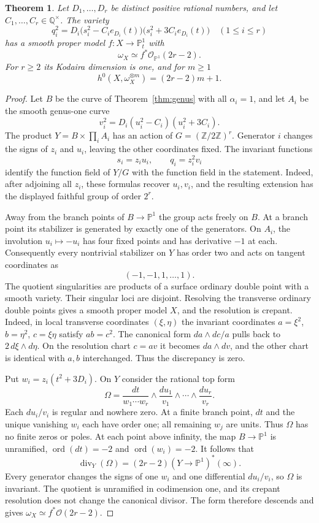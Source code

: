 \documentclass[11pt,a4paper]{article}
\newtheorem{theorem}{Theorem}[section]
\newcommand{\Q}{\mathbb Q}
\newcommand{\Pp}{\mathbb P}
\newcommand{\divisor}{\operatorname{div}}
\begin{document}
\begin{theorem}\label{thm:canonical}
Let $D_1,\ldots,D_r$ be distinct positive rational numbers, and let
$C_1,\ldots,C_r\in\Q^\times$. The variety
\[
 q_i^2=D_i\bigl(s_i^2-C_ie_{D_i}(t)\bigr)
               \bigl(s_i^2+3C_ie_{D_i}(t)\bigr)
                  \quad(1\leq i\leq r)
\]
has a smooth proper model $f:X\to\Pp^1_t$ with
\[
                   \omega_X\simeq f^*\mathcal O_{\Pp^1}(2r-2).
\]
For $r\geq2$ its Kodaira dimension is one, and for $m\geq1$
\[
                 h^0(X,\omega_X^{\otimes m})=(2r-2)m+1.
\]
\end{theorem}
\begin{proof}
Let $B$ be the curve of Theorem~\ref{thm:genus} with all $\alpha_i=1$,
and let $A_i$ be the smooth genus-one curve
\[
                  v_i^2=D_i(u_i^2-C_i)(u_i^2+3C_i).
\]
The product $Y=B\times\prod_i A_i$ has an action of
$G=(\mathbb Z/2\mathbb Z)^r$. Generator $i$ changes the signs of
$z_i$ and $u_i$, leaving the other coordinates fixed. The invariant
functions
\[
                  s_i=z_i u_i,\qquad q_i=z_i^2v_i
\]
identify the function field of $Y/G$ with the function field in the
statement. Indeed, after adjoining all $z_i$, these formulas recover
$u_i,v_i$, and the resulting extension has the displayed faithful group
of order $2^r$.

Away from the branch points of $B\to\Pp^1$ the group acts freely on
$B$. At a branch point its stabilizer is generated by exactly one of
the generators. On $A_i$, the involution $u_i\mapsto-u_i$ has four
fixed points and has derivative $-1$ at each. Consequently every
nontrivial stabilizer on $Y$ has order two and acts on tangent
coordinates as
\[
                     (-1,-1,1,\ldots,1).
\]
The quotient singularities are products of a surface ordinary double
point with a smooth variety. Their singular loci are disjoint. Resolving
the transverse ordinary double points gives a smooth proper model $X$,
and the resolution is crepant. Indeed, in local transverse coordinates
$(\xi,\eta)$ the invariant coordinates
$a=\xi^2$, $b=\eta^2$, $c=\xi\eta$ satisfy $ab=c^2$. The canonical
form $da\wedge dc/a$ pulls back to $2\,d\xi\wedge d\eta$.
On the resolution chart $c=av$ it becomes $da\wedge dv$, and the
other chart is identical with $a,b$ interchanged. Thus the discrepancy
is zero.

Put $w_i=z_i(t^2+3D_i)$. On $Y$ consider the rational top form
\[
 \Omega=\frac{dt}{w_1\cdots w_r}
                    \wedge\frac{du_1}{v_1}\wedge\cdots
                    \wedge\frac{du_r}{v_r}.
\]
Each $du_i/v_i$ is regular and nowhere zero. At a finite branch point,
$dt$ and the unique vanishing $w_i$ each have order one; all remaining
$w_j$ are units. Thus $\Omega$ has no finite zeros or poles. At each
point above infinity, the map $B\to\Pp^1$ is unramified,
$\operatorname{ord}(dt)=-2$ and $\operatorname{ord}(w_i)=-2$.
It follows that
\[
               \divisor_Y(\Omega)=(2r-2)(Y\to\Pp^1)^*(\infty).
\]
Every generator changes the signs of one $w_i$ and one differential
$du_i/v_i$, so $\Omega$ is invariant. The quotient is unramified in
codimension one, and its crepant resolution does not change the
canonical divisor. The form therefore descends and gives
$\omega_X\simeq f^*\mathcal O(2r-2)$.


\end{proof}
\end{document}
